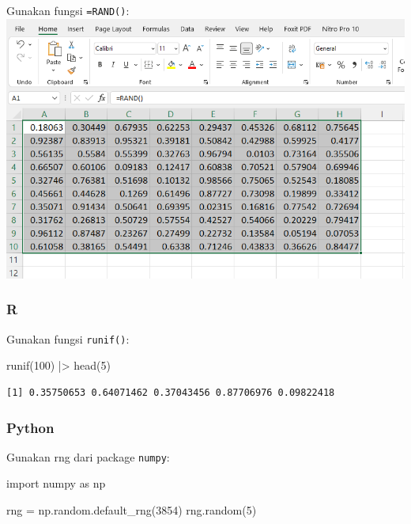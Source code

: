 \documentclass[
  letterpaper,
  DIV=11,
  numbers=noendperiod]{scrreprt}
\newenvironment{Shaded}{\begin{snugshade}}{\end{snugshade}}
\newcommand{\DecValTok}[1]{\textcolor[rgb]{0.68,0.00,0.00}{#1}}
\newcommand{\FunctionTok}[1]{\textcolor[rgb]{0.28,0.35,0.67}{#1}}
\newcommand{\ImportTok}[1]{\textcolor[rgb]{0.00,0.46,0.62}{#1}}
\newcommand{\NormalTok}[1]{\textcolor[rgb]{0.00,0.23,0.31}{#1}}
\newcommand{\OperatorTok}[1]{\textcolor[rgb]{0.37,0.37,0.37}{#1}}
\newcommand{\SpecialCharTok}[1]{\textcolor[rgb]{0.37,0.37,0.37}{#1}}
\begin{document}
Gunakan fungsi \texttt{=RAND()}: \includegraphics{./excel-rand.png}

\hypertarget{r}{%
\subsubsection{R}\label{r}}

Gunakan fungsi \texttt{runif()}:

\begin{Shaded}
\begin{Highlighting}[]
\FunctionTok{runif}\NormalTok{(}\DecValTok{100}\NormalTok{) }\SpecialCharTok{|\textgreater{}} \FunctionTok{head}\NormalTok{(}\DecValTok{5}\NormalTok{)}
\end{Highlighting}
\end{Shaded}

\begin{verbatim}
[1] 0.35750653 0.64071462 0.37043456 0.87706976 0.09822418
\end{verbatim}

\hypertarget{python}{%
\subsubsection{Python}\label{python}}

Gunakan rng dari package \texttt{numpy}:

\begin{Shaded}
\begin{Highlighting}[]
\ImportTok{import}\NormalTok{ numpy }\ImportTok{as}\NormalTok{ np}

\NormalTok{rng }\OperatorTok{=}\NormalTok{ np.random.default\_rng(}\DecValTok{3854}\NormalTok{)}
\NormalTok{rng.random(}\DecValTok{5}\NormalTok{)}
\end{Highlighting}
\end{Shaded}
\end{document}
